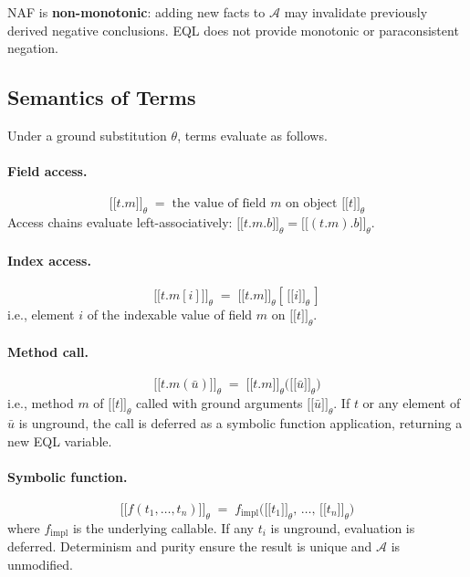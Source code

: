 \documentclass[11pt, a4paper]{article}
\newcommand{\llbracket}{\mathopen{[\![}}
\newcommand{\rrbracket}{\mathclose{]\!]}}
\theoremstyle{plain}
\theoremstyle{definition}
\theoremstyle{remark}
\begin{document}
NAF is \textbf{non-monotonic}: adding new facts to $\mathcal{A}$ may invalidate previously
derived negative conclusions.  EQL does not provide monotonic or paraconsistent negation.

\subsection{Semantics of Terms}
\label{sec:eql:terms_eval}
Under a ground substitution $\theta$, terms evaluate as follows.

\paragraph{Field access.}
\[
  \llbracket t.m \rrbracket_\theta
  \;=\;
  \text{the value of field } m \text{ on object } \llbracket t \rrbracket_\theta
\]
Access chains evaluate left-associatively:
$\llbracket t.m.b \rrbracket_\theta = \llbracket (t.m).b \rrbracket_\theta$.

\paragraph{Index access.}
\[
  \llbracket t.m[i] \rrbracket_\theta
  \;=\;
  \llbracket t.m \rrbracket_\theta [\,\llbracket i \rrbracket_\theta\,]
\]
i.e., element $i$ of the indexable value of field $m$ on
$\llbracket t \rrbracket_\theta$.

\paragraph{Method call.}
\[
  \llbracket t.m(\bar{u}) \rrbracket_\theta
  \;=\;
  \llbracket t.m \rrbracket_\theta\!
  \bigl(\llbracket \bar{u} \rrbracket_\theta\bigr)
\]
i.e., method $m$ of $\llbracket t \rrbracket_\theta$ called with ground arguments
$\llbracket \bar{u} \rrbracket_\theta$.  If $t$ or any element of $\bar{u}$ is unground,
the call is deferred as a symbolic function application, returning a new EQL variable.

\paragraph{Symbolic function.}
\[
  \llbracket f(t_1, \ldots, t_n) \rrbracket_\theta
  \;=\;
  f_{\mathrm{impl}}\!\bigl(
    \llbracket t_1 \rrbracket_\theta,\,\ldots,\,
    \llbracket t_n \rrbracket_\theta
  \bigr)
\]
where $f_{\mathrm{impl}}$ is the underlying callable.  If any $t_i$ is unground, evaluation is
deferred.  Determinism and purity ensure the result is unique and $\mathcal{A}$ is unmodified.
\end{document}
